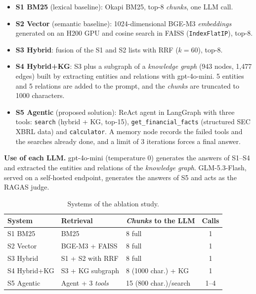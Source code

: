 \documentclass[conference]{IEEEtran}
\begin{document}
\begin{itemize}
\item \textbf{S1 BM25} (lexical baseline): Okapi BM25, top-8 \textit{chunks}, one LLM call.
\item \textbf{S2 Vector} (semantic baseline): 1024-dimensional BGE-M3 \textit{embeddings} generated on an H200 GPU and cosine search in FAISS (\texttt{IndexFlatIP}), top-8.
\item \textbf{S3 Hybrid}: fusion of the S1 and S2 lists with RRF ($k=60$), top-8.
\item \textbf{S4 Hybrid+KG}: S3 plus a subgraph of a \textit{knowledge graph} (943 nodes, 1{,}477 edges) built by extracting entities and relations with gpt-4o-mini. 5 entities and 5 relations are added to the prompt, and the \textit{chunks} are truncated to 1000 characters.
\item \textbf{S5 Agentic} (proposed solution): ReAct agent in LangGraph with three tools: \texttt{search} (hybrid + KG, top-15), \texttt{get\_financial\_facts} (structured SEC XBRL data) and \texttt{calculator}. A memory node records the failed tools and the searches already done, and a limit of 3 iterations forces a final answer.
\end{itemize}

\textbf{Use of each LLM.} gpt-4o-mini (temperature 0) generates the answers of S1--S4 and extracted the entities and relations of the \textit{knowledge graph}. GLM-5.3-Flash, served on a self-hosted endpoint, generates the answers of S5 and acts as the RAGAS judge.

\begin{table}[h]
\centering
\footnotesize
\setlength{\tabcolsep}{3pt}
\begin{tabular}{lllc}
\toprule
\textbf{System} & \textbf{Retrieval} & \textbf{\textit{Chunks} to the LLM} & \textbf{Calls} \\
\midrule
S1 BM25 & BM25 & 8 full & 1 \\
S2 Vector & BGE-M3 + FAISS & 8 full & 1 \\
S3 Hybrid & S1 + S2 with RRF & 8 full & 1 \\
S4 Hybrid+KG & S3 + KG subgraph & 8 (1000 char.) + KG & 1 \\
S5 Agentic & Agent + 3 \textit{tools} & 15 (800 char.)/search & 1--4 \\
\bottomrule
\end{tabular}
\caption{Systems of the ablation study.}
\label{tab:sistemas}
\end{table}
\end{document}
